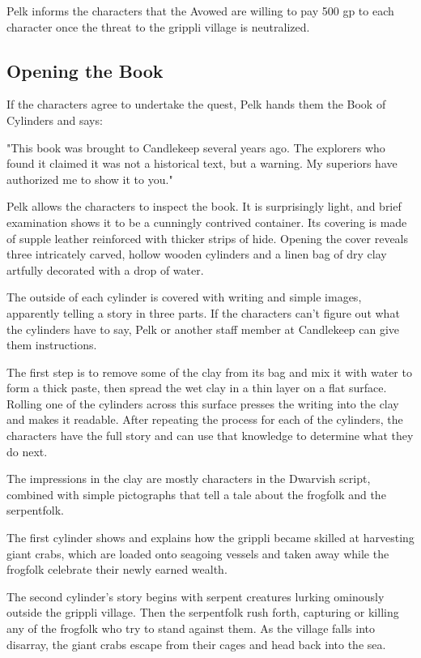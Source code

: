 \documentclass[10pt,a4paper,twoside,bg=print,twocolumn,openany,nodeprecatedcode]{dndbook}
\begin{document}
Pelk informs the characters that the Avowed are willing to pay 500 gp to each character once the threat to the grippli village is neutralized.

\subsection{Opening the Book}
If the characters agree to undertake the quest, Pelk hands them the Book of Cylinders and says:

\begin{DndReadAloud}{}
"This book was brought to Candlekeep several years ago. The explorers who found it claimed it was not a historical text, but a warning. My superiors have authorized me to show it to you."

\end{DndReadAloud}

Pelk allows the characters to inspect the book. It is surprisingly light, and brief examination shows it to be a cunningly contrived container. Its covering is made of supple leather reinforced with thicker strips of hide. Opening the cover reveals three intricately carved, hollow wooden cylinders and a linen bag of dry clay artfully decorated with a drop of water.

The outside of each cylinder is covered with writing and simple images, apparently telling a story in three parts. If the characters can't figure out what the cylinders have to say, Pelk or another staff member at Candlekeep can give them instructions.

The first step is to remove some of the clay from its bag and mix it with water to form a thick paste, then spread the wet clay in a thin layer on a flat surface. Rolling one of the cylinders across this surface presses the writing into the clay and makes it readable. After repeating the process for each of the cylinders, the characters have the full story and can use that knowledge to determine what they do next.

The impressions in the clay are mostly characters in the Dwarvish script, combined with simple pictographs that tell a tale about the frogfolk and the serpentfolk.

The first cylinder shows and explains how the grippli became skilled at harvesting giant crabs, which are loaded onto seagoing vessels and taken away while the frogfolk celebrate their newly earned wealth.

The second cylinder's story begins with serpent creatures lurking ominously outside the grippli village. Then the serpentfolk rush forth, capturing or killing any of the frogfolk who try to stand against them. As the village falls into disarray, the giant crabs escape from their cages and head back into the sea.
\end{document}
